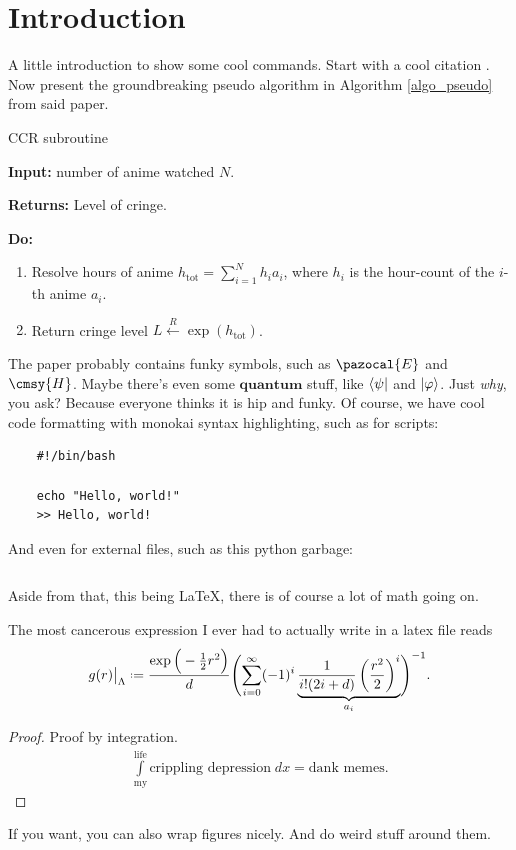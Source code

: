 \chapter{Introduction} \label{chap_Intro}
A little introduction to show some cool commands. 
Start with a cool citation \cite{crimgTest}. 
Now present the groundbreaking pseudo algorithm in Algorithm 
\ref{algo_pseudo} from said paper. \\

\begin{algorithm}[h]
	\caption{CCR subroutine}
	\textbf{Input:} 
    number of anime watched $N$.
    
	\textbf{Returns:} 
	Level of cringe.
	
	\textbf{Do:} 
	\begin{enumerate}
		\item
        Resolve hours of anime $h_{\textrm{tot}} = \sum_{i=1}^{N} h_i a_i$, where $h_i$ is the hour-count 
        of the $i$-th anime $a_i$. 
		
        \item
		Return cringe level $L  \overset{R}{\gets}  \exp({h_{\textrm{tot}} })$.
	\end{enumerate}
	\label{algo_pseudo}
\end{algorithm} 
The paper probably contains funky symbols, such as $\pazocal{E}$ and $\cmsy{H}$. 
Maybe there's even some 
$\bm{quantum}$ stuff, like $\bra{\psi}$ and $\ket{\varphi}$. Just \emph{why}, you ask? 
Because everyone thinks it is hip and funky. 
Of course, we have cool code formatting with monokai syntax highlighting, such as for scripts: \\
\begin{verbatim}
    #!/bin/bash
    
    echo "Hello, world!"
    >> Hello, world!
\end{verbatim}
And even for external files, such as this python garbage: \\
\inputminted{python}{codes/test.py}
Aside from that, this being \LaTeX, there is of course a lot of math going on. 
\begin{theo}
	The most cancerous expression I ever had to actually write in a latex file reads
	\begin{align*}
		\restr{g(r)}{\Lambda} \defeq
		\frac{\exp 
			\Big( -\frac{1}{2} r^2 \Big) }{d} \Biggl( 
				\sum_{i=0}^{\infty} (-1)^i 
					\underbrace{
					\frac{1}{i! (2i+d)} \left( \frac{r^2}{2}\right)^i
					}_{a_i} 
			\Biggr)^{-1}.
	\end{align*}
\end{theo}
\begin{proof}
	Proof by integration. 
	\begin{align*}
		\int\limits_{\mathrm{my}}^{\mathrm{life}} 
			\text{crippling depression} \; dx = \text{dank memes}.
	\end{align*}
\end{proof}
If you want, you can also wrap figures nicely. And do weird stuff around them. 

